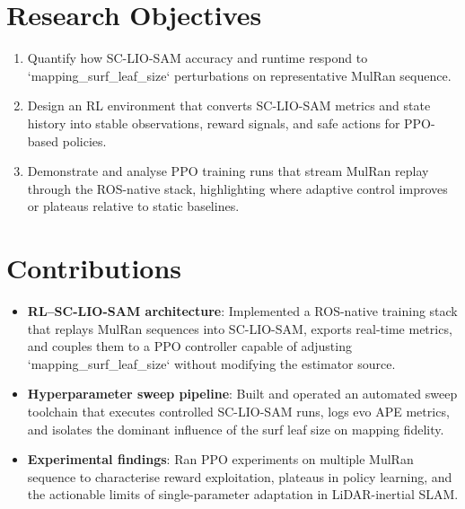 \section{Research Objectives}
\begin{enumerate}[label=\textbf{O\arabic*}]
  \item Quantify how SC-LIO-SAM accuracy and runtime respond to `mapping\_surf\_leaf\_size` perturbations on representative MulRan sequence.
  \item Design an RL environment that converts SC-LIO-SAM metrics and state history into stable observations, reward signals, and safe actions for PPO-based policies.
  \item Demonstrate and analyse PPO training runs that stream MulRan replay through the ROS-native stack, highlighting where adaptive control improves or plateaus relative to static baselines.
\end{enumerate}

\section{Contributions}
\begin{itemize}
  \item \textbf{RL–SC-LIO-SAM architecture}: Implemented a ROS-native training stack that replays MulRan sequences into SC-LIO-SAM, exports real-time metrics, and couples them to a PPO controller capable of adjusting `mapping\_surf\_leaf\_size` without modifying the estimator source.
  \item \textbf{Hyperparameter sweep pipeline}: Built and operated an automated sweep toolchain that executes controlled SC-LIO-SAM runs, logs evo APE metrics, and isolates the dominant influence of the surf leaf size on mapping fidelity.
  \item \textbf{Experimental findings}: Ran PPO experiments on multiple MulRan sequence to characterise reward exploitation, plateaus in policy learning, and the actionable limits of single-parameter adaptation in LiDAR-inertial SLAM.
\end{itemize}
